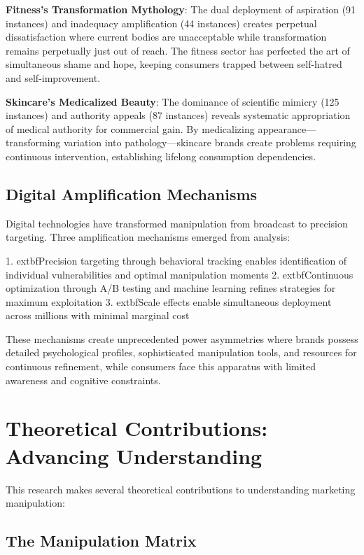 \textbf{Fitness's Transformation Mythology}: The dual deployment of aspiration (91 instances) and inadequacy amplification (44 instances) creates perpetual dissatisfaction where current bodies are unacceptable while transformation remains perpetually just out of reach. The fitness sector has perfected the art of simultaneous shame and hope, keeping consumers trapped between self-hatred and self-improvement.

\textbf{Skincare's Medicalized Beauty}: The dominance of scientific mimicry (125 instances) and authority appeals (87 instances) reveals systematic appropriation of medical authority for commercial gain. By medicalizing appearance—transforming variation into pathology—skincare brands create problems requiring continuous intervention, establishing lifelong consumption dependencies.

\subsection{Digital Amplification Mechanisms}

Digital technologies have transformed manipulation from broadcast to precision targeting. Three amplification mechanisms emerged from analysis:

1. 	extbf{Precision targeting} through behavioral tracking enables identification of individual vulnerabilities and optimal manipulation moments
2. 	extbf{Continuous optimization} through A/B testing and machine learning refines strategies for maximum exploitation
3. 	extbf{Scale effects} enable simultaneous deployment across millions with minimal marginal cost

These mechanisms create unprecedented power asymmetries where brands possess detailed psychological profiles, sophisticated manipulation tools, and resources for continuous refinement, while consumers face this apparatus with limited awareness and cognitive constraints.

\section{Theoretical Contributions: Advancing Understanding}
\label{sec:theoretical_contributions}

This research makes several theoretical contributions to understanding marketing manipulation:

\subsection{The Manipulation Matrix}

